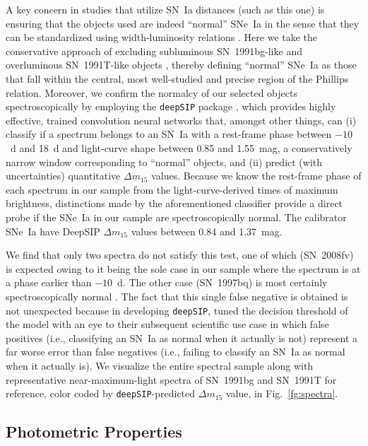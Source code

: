 \documentclass[12pt]{aastex631}
\begin{document}
\begin{appendices}
A key concern in studies that utilize SN~Ia distances (such as this one) is ensuring that the objects used are indeed ``normal'' SNe~Ia in the sense that they can be standardized using width-luminosity relations \citep{Phillips:1993}. Here we take the conservative approach of excluding subluminous SN~1991bg-like \citep{91bg-Filippenko,91bg-Leibundgut} and overluminous SN~1991T-like objects \citep{91T-Filippenko,91T-Phillips}, thereby defining ``normal'' SNe~Ia as those that fall within the central, most well-studied and precise region of the Phillips relation. Moreover, we confirm the normalcy of our selected objects spectroscopically by employing the \texttt{deepSIP} package \citep{deepSIP}, which provides highly effective, trained convolution neural networks that, amongst other things, can (i) classify if a spectrum belongs to an SN~Ia with a rest-frame phase between $-10$~d and 18~d and light-curve shape \citep[parameterized by \texttt{SNooPy}'s $\Delta m_{15}$ parameter; see][for more details]{SNooPy} between 0.85 and 1.55~mag, a conservatively narrow window corresponding to ``normal'' objects, and (ii) predict (with uncertainties) quantitative $\Delta m_{15}$ values. Because we know the rest-frame phase of each spectrum in our sample from the light-curve-derived times of maximum brightness, distinctions made by the aforementioned classifier provide a direct probe if the SNe~Ia in our sample are spectroscopically normal.  The calibrator SNe~Ia have DeepSIP $\Delta m_{15}$ values between 0.84 and 1.37~mag.

We find that only two spectra do not satisfy this test, one of which (SN~2008fv) is expected owing to it being the sole case in our sample where the spectrum is at a phase earlier than $-10$~d. The other case (SN~1997bq) is most certainly spectroscopically normal \citep[see][]{Blondin2012}. The fact that this single false negative is obtained is not unexpected because in developing \texttt{deepSIP}, \citet{deepSIP} tuned the decision threshold of the model with an eye to their subsequent scientific use case in which false positives (i.e., classifying an SN~Ia as normal when it actually is not) represent a far worse error than false negatives (i.e., failing to classify an SN~Ia as normal when it actually is). We visualize the entire spectral sample along with representative near-maximum-light spectra of SN~1991bg and SN~1991T for reference, color coded by \texttt{deepSIP}-predicted $\Delta m_{15}$ value, in Fig.~\ref{fg:spectra}.

\subsection{Photometric Properties}
     

\end{appendices}
\end{document}
